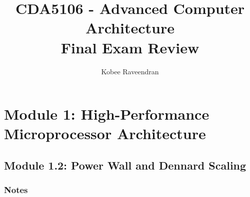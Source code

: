 \documentclass[12pt]{extarticle}
\title{CDA5106 - Advanced Computer Architecture \\ Final Exam Review}
\author{Kobee Raveendran}
\date{}
\begin{document}
    \maketitle

    \section{Module 1: High-Performance Microprocessor Architecture}

    \subsection{Module 1.2: Power Wall and Dennard Scaling}

    \subsubsection{Notes}
\end{document}
